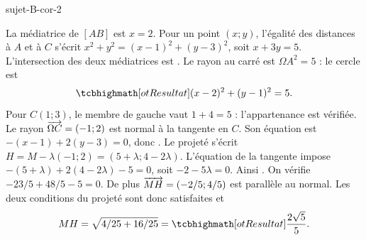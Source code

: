 \begin{blocEdition}{sujet-B-cor-2}

La médiatrice de $[AB]$ est $x=2$.
Pour un point $(x;y)$, l'égalité des distances à $A$ et à $C$ s'écrit
$x^2+y^2=(x-1)^2+(y-3)^2$, soit $x+3y=5$.
L'intersection des deux médiatrices est .
Le rayon au carré est $\Omega A^2=5$ : le cercle est
\[\res{(x-2)^2+(y-1)^2=5}.\]
Pour $C(1;3)$, le membre de gauche vaut $1+4=5$ : l'appartenance est vérifiée.
Le rayon $\overrightarrow{\Omega C}=(-1;2)$ est normal à la tangente en $C$.
Son équation est $-(x-1)+2(y-3)=0$, donc .
Le projeté s'écrit $H=M-\lambda(-1;2)=(5+\lambda;4-2\lambda)$.
L'équation de la tangente impose $-(5+\lambda)+2(4-2\lambda)-5=0$,
soit $-2-5\lambda=0$. Ainsi .
On vérifie $-23/5+48/5-5=0$. De plus $\overrightarrow{MH}=(-2/5;4/5)$ est parallèle au normal.
Les deux conditions du projeté sont donc satisfaites et
\[MH=\sqrt{4/25+16/25}=\res{\frac{2\sqrt5}{5}}.\]

\label{figedition-sujet-B-cor-2-1}
\end{blocEdition}

